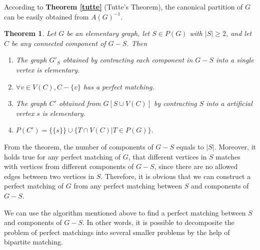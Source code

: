 \documentclass{article}
\newtheorem{theorem}{Theorem}
\begin{document}
				According to {\bfseries Theorem \ref{tutte}} (Tutte's Theorem), the canonical partition of $G$ can be easily obtained from $A(G)^{-1}$.

				\begin{theorem}
					Let $G$ be an elementary graph, let $S \in P(G)$ with $|S| \ge 2$, and let $C$ be any connected component of $G - S$. Then

					\begin{enumerate}
						\item The graph $G'_S$ obtained by contracting each component in $G - S$ into a single vertex is elementary.
						\item $\forall v \in V(C), C - \{v\}$ has a perfect matching.
						\item The graph $C'$ obtained from $G[S \cup V(C)]$ by contracting $S$ into a artificial vertex $s$ is elementary.
						\item $P(C') = \{\{s\}\} \cup \{T \cap V(C) | T \in P(G)\}$.
					\end{enumerate}

					\label{canonical}
				\end{theorem}

				From the theorem, the number of components of $G - S$ equals to $|S|$. Moreover, it holds true for any perfect matching of $G$, that different vertices in $S$ matches with vertices from different components of $G - S$, since there are no allowed edges between two vertices in $S$. Therefore, it is obvious that we can construct a perfect matching of $G$ from any perfect matching between $S$ and components of $G - S$.

				We can use the algorithm mentioned above to find a perfect matching between $S$ and components of $G - S$. In other words, it is possible to decomposite the problem of perfect matchings into several smaller problems by the help of bipartite matching.
\end{document}
